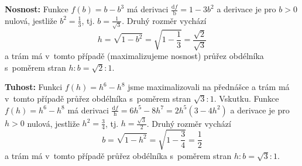 \textbf{Nosnost: }Funkce $f(b)=b-b^3$ má derivaci $\frac{\mathrm df}{\mathrm b}=1-3b^2$ a derivace je pro $b>0$ nulová, jestliže $b^2=\frac 13$, tj. $b=\frac{1}{\sqrt 3}$.  Druhý rozměr vychází
$$h=\sqrt{1-b^2}=\sqrt{1-\frac 13}=\frac{\sqrt 2}{\sqrt 3}$$ a trám má v tomto případě (maximalizujeme nosnost) průřez obdélníka s poměrem stran $h:b=\sqrt 2:1$.

\textbf{Tuhost: }Funkci $f(h)=h^6-h^8$ jsme maximalizovali na přednášce a  trám má v tomto případě průřez obdélníka s poměrem stran $\sqrt 3:1$.
Vskutku. Funkce $f(h)=h^6-h^8$ má derivaci $\frac{\mathrm df}{\mathrm h}=6h^5-8h^7=2h^5(3-4h^2)$ a derivace je pro $h>0$ nulová, jestliže $h^2=\frac 34$, tj. $h=\frac{\sqrt 3}{2}$.  Druhý rozměr vychází
$$b=\sqrt{1-h^2}=\sqrt{1-\frac 34}=\frac{1}{2}$$ a trám má v tomto případě  průřez obdélníka s poměrem stran $h:b=\sqrt 3:1$.


\konec

\stranka


